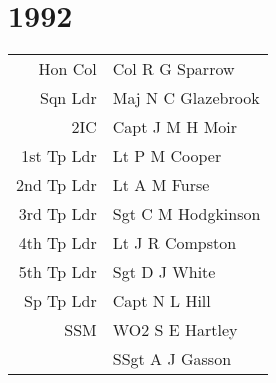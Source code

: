 \chapter*{1992}

\vspace*{10mm}

\begin{center}
  \begin{tabular}{rl}
    Hon Col & Col R G Sparrow \\
    Sqn Ldr & Maj N C Glazebrook \\
    2IC & Capt J M H Moir \\
    1st Tp Ldr & Lt P M Cooper \\
    2nd Tp Ldr & Lt A M Furse \\
    3rd Tp Ldr & Sgt C M Hodgkinson \\
    4th Tp Ldr & Lt J R Compston \\
    5th Tp Ldr & Sgt D J White \\
    Sp Tp Ldr & Capt N L Hill \\
    SSM & WO2 S E Hartley \\
    & SSgt A J Gasson \\
  \end{tabular}
\end{center}

\vspace*{10mm}

